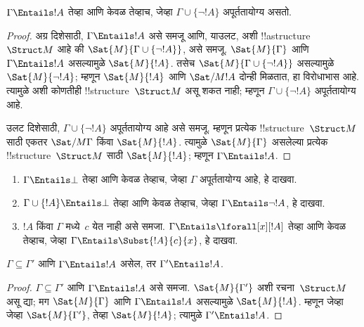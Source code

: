 \documentclass[../../../include/open-logic-section]{subfiles}
\begin{document}
\begin{prop}
$\Gamma \Entails !A$ तेव्हा आणि केवळ तेव्हाच, जेव्हा
$\Gamma \cup \{\lnot !A\}$ अपूर्ततायोग्य असतो.
\end{prop}

\begin{proof}
अग्र दिशेसाठी, $\Gamma \Entails !A$ असे समजू आणि, याउलट, अशी
!!a{structure}~$\Struct M$ आहे की $\Sat{M}{\Gamma
  \cup \{ \lnot !A \}}$, असे समजू. $\Sat{M}{\Gamma}$ आणि
$\Gamma \Entails !A$ असल्यामुळे $\Sat{M}{!A}$. तसेच
$\Sat{M}{\Gamma\cup \{ \lnot !A \}}$ असल्यामुळे
$\Sat{M}{\lnot !A}$; म्हणून $\Sat{M}{!A}$ आणि $\Sat/{M}{!A}$ दोन्ही
मिळतात, हा विरोधाभास आहे. त्यामुळे अशी कोणतीही
!!{structure}~$\Struct M$ असू शकत नाही; म्हणून
$\Gamma \cup \{ \lnot !A \}$ अपूर्ततायोग्य आहे.

उलट दिशेसाठी, $\Gamma \cup \{ \lnot !A \}$ अपूर्ततायोग्य आहे असे
समजू. म्हणून प्रत्येक !!{structure}~$\Struct M$ साठी एकतर
$\Sat/{M}{\Gamma}$ किंवा $\Sat{M}{!A}$. त्यामुळे
$\Sat{M}{\Gamma}$ असलेल्या प्रत्येक !!{structure}~$\Struct M$ साठी
$\Sat{M}{!A}$; म्हणून $\Gamma \Entails !A$.
\end{proof}

\begin{prob}
\begin{enumerate}
\item $\Gamma \Entails \bot$ तेव्हा आणि केवळ तेव्हाच, जेव्हा $\Gamma$
  अपूर्ततायोग्य आहे, हे दाखवा.
\item $\Gamma \cup \{!A\} \Entails \bot$ तेव्हा आणि केवळ तेव्हाच,
  जेव्हा $\Gamma \Entails \lnot !A$, हे दाखवा.
\item $!A$ किंवा $\Gamma$ मध्ये~$c$ येत नाही असे समजा.
  $\Gamma \Entails \lforall[x][!A]$ तेव्हा आणि केवळ तेव्हाच, जेव्हा
  $\Gamma \Entails \Subst{!A}{c}{x}$, हे दाखवा.
\end{enumerate}
\end{prob}

\begin{prop}
$\Gamma \subseteq \Gamma'$ आणि $\Gamma \Entails !A$ असेल, तर
$\Gamma' \Entails !A$.
\end{prop}

\begin{proof}
$\Gamma \subseteq \Gamma'$ आणि $\Gamma \Entails !A$ असे समजा.
$\Sat{M}{\Gamma'}$ अशी रचना~$\Struct M$ असू द्या; मग
$\Sat{M}{\Gamma}$ आणि $\Gamma \Entails !A$ असल्यामुळे
$\Sat{M}{!A}$. म्हणून जेव्हा जेव्हा $\Sat{M}{\Gamma'}$, तेव्हा
$\Sat{M}{!A}$; त्यामुळे $\Gamma' \Entails !A$.
\end{proof}
\end{document}
